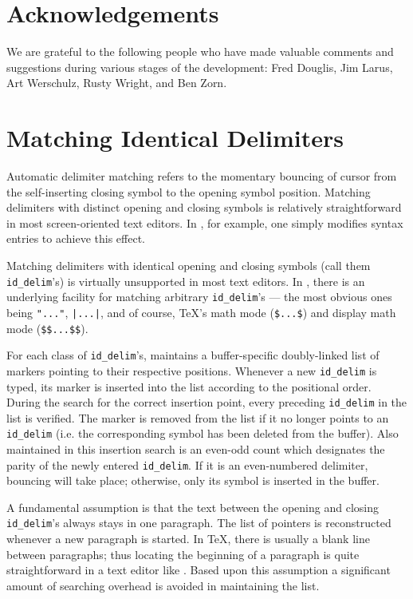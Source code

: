 \section{Acknowledgements}
We are grateful to the following people who have made valuable
comments and suggestions during various stages of the development:
Fred Douglis, Jim Larus, Art Werschulz, Rusty Wright, and Ben Zorn.

% 
% 



\appendix

\section{Matching Identical Delimiters}
Automatic delimiter matching 
refers to the momentary bouncing of cursor from the self-inserting
closing symbol to the opening symbol position.
Matching delimiters with distinct opening and closing symbols is
relatively straightforward in most screen-oriented text editors.
In {\emacs}, for example, one simply modifies syntax entries to achieve
this effect.

Matching delimiters with identical opening and closing symbols (call them
\verb|id_delim|'s) is virtually unsupported in most text editors.
In {\TM}, there is an underlying facility for matching arbitrary
\verb|id_delim|'s --- the most obvious ones being
\verb|"..."|, \verb#|...|#, and of course,
{\TeX}'s math mode (\verb|$...$|) and display math mode (\verb|$$...$$|).

For each class of \verb|id_delim|'s, {\TM} maintains a buffer-specific
doubly-linked list of markers pointing to their respective positions.
Whenever a new \verb|id_delim| is typed, its marker is inserted into
the list according to the positional order.
During the search for the correct insertion point, every
preceding \verb|id_delim| in the list is verified.
The marker is removed from the list if it no longer points
to an \verb|id_delim| (i.e. the corresponding symbol has been deleted
from the buffer).
Also maintained in this insertion search is
an even-odd count which designates the parity of the newly entered
\verb|id_delim|.  If it is an even-numbered delimiter, bouncing
will take place; otherwise, only its symbol is inserted in the buffer.

A fundamental assumption is that the text between
the opening and closing \verb|id_delim|'s always stays in one paragraph.
The list of pointers is reconstructed whenever a new paragraph is started.
In {\TeX}, there is usually a blank line between paragraphs; thus
locating the beginning of a paragraph is quite straightforward in 
a text editor like {\emacs}.
Based upon this assumption a significant amount of searching
overhead is avoided in maintaining the list.

